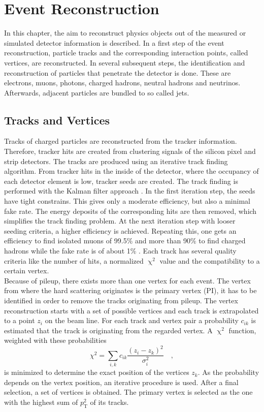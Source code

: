 \section{Event Reconstruction}
In this chapter, the aim to reconstruct physics objects out of the measured or simulated detector information is described. In a first step of the event reconstruction, particle tracks and the corresponding interaction points, called vertices, are reconstructed. In several subsequent steps, the identification and reconstruction of particles that penetrate the detector is done. These are electrons, muons, photons, charged hadrons, neutral hadrons and neutrinos. Afterwards, adjacent particles are bundled to so called jets. 

\subsection{Tracks and Vertices}
Tracks of charged particles are reconstructed from the tracker information. Therefore, tracker hits are created from clustering signals of the silicon pixel and strip detectors. The tracks are produced using an iterative track finding algorithm. From tracker hits in the inside of the detector, where the occupancy of each detector element is low, tracker seeds are created. The track finding is performed with the Kalman filter approach \cite{KalmanFilter}. In the first iteration step, the seeds have tight constrains. This gives only a moderate efficiency, but also a minimal fake rate. The energy deposits of the corresponding hits are then removed, which simplifies the track finding problem. At the next iteration step with looser seeding criteria, a higher efficiency is achieved. Repeating this, one gets an efficiency to find isolated muons of 99.5\% and more than 90\% to find charged hadrons while the fake rate is of about 1\% \cite{ParticleFlow2}. Each track has several quality criteria like the number of hits, a normalized $\upchi^2$ value and the compatibility to a certain vertex.\\

Because of pileup, there exists more than one vertex for each event. The vertex from where the hard scattering originates is the primary vertex (PI), it has to be identified in order to remove the tracks originating from pileup. The vertex reconstruction starts with a set of possible vertices and each track is extrapolated to a point $z_i$ on the beam line. For each track and vertex pair a probability $c_{ik}$ is estimated that the track is originating from the regarded vertex. A $\upchi^2$ function, weighted with these probabilities
\begin{equation}
\chi^2 = \sum_{i,k} c_{ik} \frac{(z_i-z_k)^2}{\sigma_i^2}	\quad ,	
\end{equation}
is minimized to determine the exact position of the vertices $z_k$. As the probability depends on the vertex position, an iterative procedure is used. After a final selection, a set of vertices is obtained. The primary vertex is selected as the one with the highest sum of $p_\textrm{T}^2$ of its tracks. 

